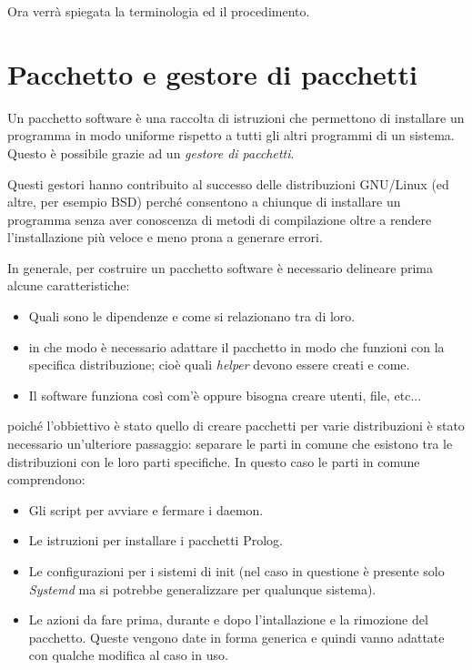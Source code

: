\documentclass[10pt,titlepage,twoside,a4paper]{report}
\begin{document}
Ora verrà spiegata la terminologia ed il procedimento.


\section{Pacchetto e gestore di pacchetti} \label{pacchetto-e-gestore-di-pacchetti}
Un pacchetto software è una raccolta di istruzioni che permettono di 
installare un programma in modo uniforme rispetto a tutti gli altri programmi 
di un sistema. Questo è possibile grazie ad un \emph{gestore di 
pacchetti}.

Questi gestori hanno contribuito al successo delle distribuzioni GNU/Linux (ed 
altre, per esempio BSD) perché consentono a chiunque di installare un 
programma senza aver conoscenza di metodi di compilazione oltre a rendere 
l'installazione più veloce e meno prona a generare errori.

In generale, per costruire un pacchetto software è necessario delineare prima 
alcune caratteristiche:
\begin{itemize}
    \item Quali sono le dipendenze e come si relazionano tra di loro.
    \item in che modo è necessario adattare il pacchetto in modo che funzioni 
          con la specifica distribuzione; cioè quali \emph{helper} devono 
essere creati e come.
    \item Il software funziona così com'è oppure bisogna creare utenti, 
file, etc...
\end{itemize}

poiché l'obbiettivo è stato quello di creare pacchetti per varie 
distribuzioni è stato necessario un'ulteriore passaggio: separare le parti in 
comune che esistono tra le distribuzioni con le loro parti specifiche. In 
questo caso le parti in comune comprendono:
\begin{itemize}
    \item Gli script per avviare e fermare i daemon.
    \item Le istruzioni per installare i pacchetti Prolog.
    \item Le configurazioni per i sistemi di init (nel caso in questione è 
presente solo \emph{Systemd} ma si potrebbe generalizzare per qualunque 
sistema).
    \item Le azioni da fare prima, durante e dopo l'intallazione e la rimozione 
del pacchetto. Queste vengono date in forma generica e quindi vanno adattate 
con qualche modifica al caso in uso.
\end{itemize}
\end{document}
